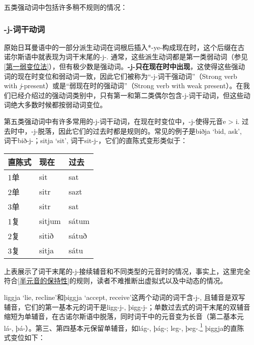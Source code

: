 五类强动词中包括许多稍不规则的情况：

\subsubsection{-j-词干动词}

原始日耳曼语中的一部分派生动词在词根后插入*-ye-构成现在时，这个后缀在古诺尔斯语中就表现为词干末尾的-j-. 通常，这些派生动词都是第一类弱动词（参见\ref{第一弱变位法}），但有极少数是强动词。\textbf{-j-只在现在时中出现}，这使得这些强动词的现在时变位和弱动词一致，因此它们被称为“-j-词干强动词”（Strong verb with \textit{j}-present）或是“弱现在时的强动词”（Strong verb with weak present）。在我们已经介绍过的强动词类别中，只有第一和第二类偶尔包含-j-词干动词，但这些动词绝大多数时候都按弱动词变位。

第五类强动词中有许多常用的-j-词干动词，在现在时变位中，-j-使得元音e > i. 过去时中，-j-脱落，因此它们的过去时都是规则的。常见的例子是biðja `bid, ask‌', 词干bið-j-；sitja `sit‌', 词干sit-j-，它们的直陈式变形类似于：

\begin{longtable}{lll}
    \toprule
    直陈式 & 现在   & 过去  \\
    \midrule
    \endhead
    \bottomrule
    \endfoot
    1单    & sit    & sat   \\
    2单    & sitr   & sazt  \\
    3单    & sitr   & sat   \\
    1复    & sitjum & sátum \\
    2复    & sitið  & sátuð \\
    3复    & sitja  & sátu  \\
\end{longtable}

上表展示了词干末尾的-j-接续辅音和不同类型的元音时的情况，事实上，这里完全符合\ref{半元音的保持性}的规则，读者不难推断出虚拟式以及中动态的情况。

liggja `lie, recline‌'和þiggja `accept, receive‌'这两个动词的词干含-j-, 且辅音是双写辅音，它们的第一基本元的词干是ligg-j-, þigg-j-；单数过去式的词干末尾的双辅音缩短为单辅音，在古诺尔斯语中脱落，同时词干中的元音变为长音（第二基本元lá-, þá-）。第三、第四基本元保留单辅音，如lág-, þág-; leg-, þeg-.\footnote{这些词本来的形式就如*ligja，-g在i前发生延长为双辅音发生在原始诺尔斯语晚期，一些i-词干名词中也有这样的现象，如bekkr. 由于-j-只在现在时中出现，辅音延长只影响了现在时，可以认为其过去时基本是规则的。另外，这个音变没有发生完全，在一些挪威方言中也有不双写g的现在时形式存在。}
þiggja的直陈式变位如下：

